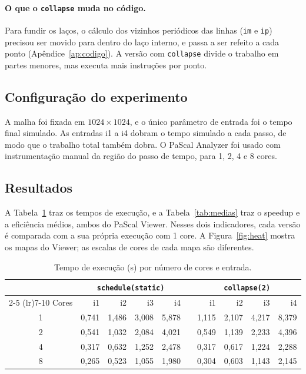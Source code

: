\documentclass[a4paper,12pt]{article}
\begin{document}
\paragraph{O que o \texttt{collapse} muda no código.} Para fundir os laços, o
cálculo dos vizinhos periódicos das linhas (\texttt{im} e \texttt{ip}) precisou
ser movido para dentro do laço interno, e passa a ser refeito a cada ponto
(Apêndice~\ref{ap:codigo}). A versão com \texttt{collapse} divide o trabalho em
partes menores, mas executa mais instruções por ponto.

\subsection{Configuração do experimento}

A malha foi fixada em $1024 \times 1024$, e o único parâmetro de entrada foi o
tempo final simulado. As entradas i1 a i4 dobram o tempo simulado a cada passo,
de modo que o trabalho total também dobra. O PaScal Analyzer foi usado com
instrumentação manual da região do passo de tempo, para 1, 2, 4 e 8 cores.

\subsection{Resultados}

A Tabela~\ref{tab:tempo} traz os tempos de execução, e a
Tabela~\ref{tab:medias} traz o speedup e a eficiência médios, ambos do PaScal
Viewer. Nesses dois indicadores, cada versão é comparada com a sua própria
execução com 1 core. A Figura~\ref{fig:heat} mostra os mapas do Viewer; as
escalas de cores de cada mapa são diferentes.

\begin{table}[ht]
\centering
\caption{Tempo de execução (s) por número de cores e entrada.}
\label{tab:tempo}
\small
\begin{tabular}{c rrrr c rrrr}
\toprule
 & \multicolumn{4}{c}{\texttt{schedule(static)}} & & \multicolumn{4}{c}{\texttt{collapse(2)}} \\
\cmidrule(lr){2-5} \cmidrule(lr){7-10}
Cores & i1 & i2 & i3 & i4 & & i1 & i2 & i3 & i4 \\
\midrule
1 & 0,741 & 1,486 & 3,008 & 5,878 & & 1,115 & 2,107 & 4,217 & 8,379 \\
2 & 0,541 & 1,032 & 2,084 & 4,021 & & 0,549 & 1,139 & 2,233 & 4,396 \\
4 & 0,317 & 0,632 & 1,252 & 2,478 & & 0,317 & 0,617 & 1,224 & 2,288 \\
8 & 0,265 & 0,523 & 1,055 & 1,980 & & 0,304 & 0,603 & 1,143 & 2,145 \\
\bottomrule
\end{tabular}
\end{table}
\end{document}
